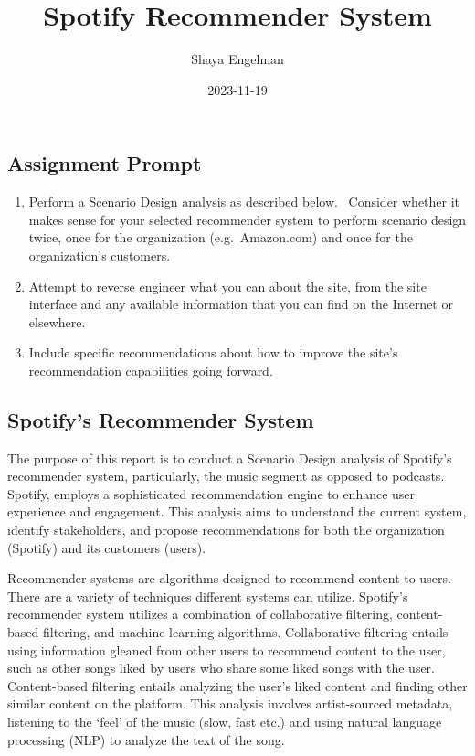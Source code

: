 \documentclass[
]{article}
\title{Spotify Recommender System}
\author{Shaya Engelman}
\date{2023-11-19}
\begin{document}
\maketitle

\hypertarget{assignment-prompt}{%
\subsection{Assignment Prompt}\label{assignment-prompt}}

\begin{enumerate}
\def\labelenumi{\arabic{enumi}.}
\item
  Perform a Scenario Design analysis as described below. ~Consider
  whether it makes sense for your selected recommender system to perform
  scenario design twice, once for the organization (e.g.~Amazon.com) and
  once for the organization's customers.
\item
  Attempt to reverse engineer what you can about the site, from the site
  interface and any available information that you can find on the
  Internet or elsewhere.
\item
  Include specific recommendations about how to improve the site's
  recommendation capabilities going forward.~
\end{enumerate}

\hypertarget{spotifys-recommender-system}{%
\subsection{Spotify's Recommender
System}\label{spotifys-recommender-system}}

The purpose of this report is to conduct a Scenario Design analysis of
Spotify's recommender system, particularly, the music segment as opposed
to podcasts. Spotify, employs a sophisticated recommendation engine to
enhance user experience and engagement. This analysis aims to understand
the current system, identify stakeholders, and propose recommendations
for both the organization (Spotify) and its customers (users).

Recommender systems are algorithms designed to recommend content to
users. There are a variety of techniques different systems can utilize.
Spotify's recommender system utilizes a combination of collaborative
filtering, content-based filtering, and machine learning algorithms.
Collaborative filtering entails using information gleaned from other
users to recommend content to the user, such as other songs liked by
users who share some liked songs with the user. Content-based filtering
entails analyzing the user's liked content and finding other similar
content on the platform. This analysis involves artist-sourced metadata,
listening to the `feel' of the music (slow, fast etc.) and using natural
language processing (NLP) to analyze the text of the song.
\end{document}
